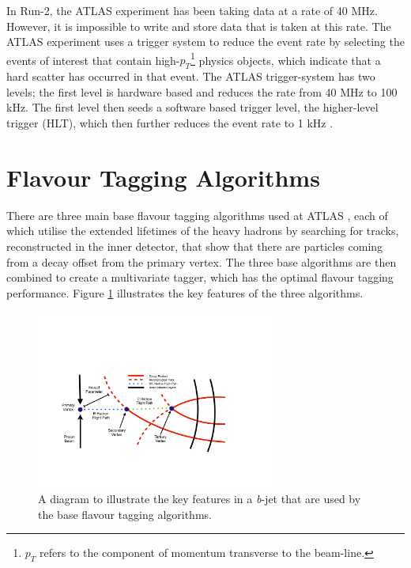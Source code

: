 \documentclass[12pt, onecolumn,notitlepage]{article}
\begin{document}
In Run-2, the ATLAS experiment has been taking data at a rate of 40 MHz. However, it is impossible to write and store data that is taken at this rate.
The ATLAS experiment uses a trigger system to reduce the event rate by selecting the events of interest that contain 
high-$p_{T}$\footnote{$p_{T}$ refers to the component of momentum transverse to the beam-line.} 
physics objects, which 
indicate that a hard scatter has occurred in that event. 
The ATLAS trigger-system has two levels; the first level is hardware based and reduces the rate from 40 MHz to 100 kHz.
The first level then seeds a software 
based trigger level, the higher-level trigger (HLT), which then further reduces the event rate to 1 kHz \cite{bib_trigger}. 

\newpage
\section{Flavour Tagging Algorithms}  \label{s_Algos}

There are three main base flavour tagging algorithms used at ATLAS \cite{bib_algos}, each of which utilise the extended lifetimes of the heavy hadrons by searching for tracks,
reconstructed in the inner detector, that show that there are particles coming from a decay offset from the primary vertex.
The three base algorithms are then combined to create a multivariate tagger, which has the optimal flavour tagging performance.
Figure \ref{B-Tagging_Diagram} illustrates the key features of the three algorithms.

\begin{figure}[!htb]
  \begin{center}
    \includegraphics[width=0.7\textwidth]{B-Tagging_Diagram.pdf}
    \caption{A diagram to illustrate the key features in a \textit{b}-jet that are used by the base flavour tagging algorithms.}
    \label{B-Tagging_Diagram}
  \end{center}
  \vspace{-0.5cm}
\end{figure}
\end{document}
